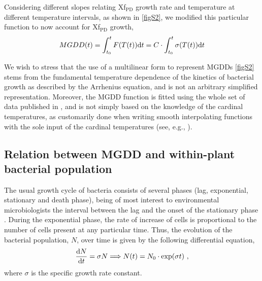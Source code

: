 Considering different slopes relating Xf$_{\textrm{PD}}$ growth rate and
temperature at different temperature intervals, as shown in \cref{figS2}, we
modified this particular function to now account for Xf$_{\textrm{PD}}$ growth,
\begin{equation}\label{eq:MGDD_t}
    MGDD(t)=\int_{t_0}^tF(T(t))\mathrm{d} t=C\cdot\int_{t_0}^t\sigma(T(t))\mathrm{d} t
\end{equation}

We wish to stress that the use of a multilinear form to represent MGDDs
\cref{figS2} stems from the fundamental temperature dependence of the kinetics
of bacterial growth as described by the Arrhenius equation, and is not an
arbitrary simplified representation. Moreover, the MGDD function is fitted
using the whole set of data published in \cite{Feil2001}, and is not simply
based on the knowledge of the cardinal temperatures, as customarily done when
writing smooth interpolating functions with the sole input of the cardinal
temperatures (see, e.g., \cite{Yan1999}).

\subsection{Relation between MGDD and within-plant bacterial
    population}\label{app:MGDD_growth} %

The usual growth cycle of bacteria consists of several phases (lag,
exponential, stationary and death phase), being of most interest to
environmental microbiologists the interval between the lag and the onset of the
stationary phase  \cite{MAIER200937}. During the exponential phase, the rate of
increase of cells is proportional to the number of cells present at any
particular time. Thus, the evolution of the bacterial population, $N$, over
time is given by the following differential equation,
\begin{equation}
    \frac{\mathrm{d} N}{\mathrm{d} t}=\sigma N \Longrightarrow N(t)=N_0\cdot\exp(\sigma t) \ ,
\end{equation}
where $\sigma$ is the specific growth rate constant.

